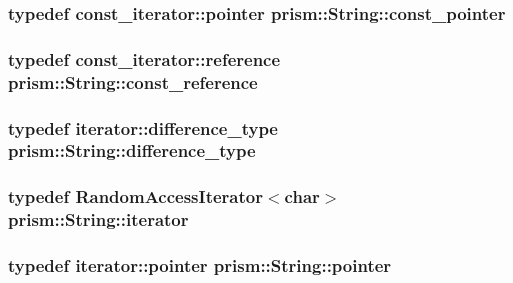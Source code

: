 \subsubsection[{\texorpdfstring{const\+\_\+pointer}{const_pointer}}]{\setlength{\rightskip}{0pt plus 5cm}typedef {\bf const\+\_\+iterator\+::pointer} {\bf prism\+::\+String\+::const\+\_\+pointer}}\hypertarget{classprism_1_1_string_adbea4cbf0f4f62948eb2accf7d402456}{}\label{classprism_1_1_string_adbea4cbf0f4f62948eb2accf7d402456}
\subsubsection[{\texorpdfstring{const\+\_\+reference}{const_reference}}]{\setlength{\rightskip}{0pt plus 5cm}typedef {\bf const\+\_\+iterator\+::reference} {\bf prism\+::\+String\+::const\+\_\+reference}}\hypertarget{classprism_1_1_string_a7825c62cb2047e36ec704a17ef94f299}{}\label{classprism_1_1_string_a7825c62cb2047e36ec704a17ef94f299}
\subsubsection[{\texorpdfstring{difference\+\_\+type}{difference_type}}]{\setlength{\rightskip}{0pt plus 5cm}typedef {\bf iterator\+::difference\+\_\+type} {\bf prism\+::\+String\+::difference\+\_\+type}}\hypertarget{classprism_1_1_string_a50fc3d423db1d24c511b28b24e4a7c00}{}\label{classprism_1_1_string_a50fc3d423db1d24c511b28b24e4a7c00}
\subsubsection[{\texorpdfstring{iterator}{iterator}}]{\setlength{\rightskip}{0pt plus 5cm}typedef {\bf Random\+Access\+Iterator}$<$char$>$ {\bf prism\+::\+String\+::iterator}}\hypertarget{classprism_1_1_string_adacc7975837e5fff95d70690777fb330}{}\label{classprism_1_1_string_adacc7975837e5fff95d70690777fb330}
\subsubsection[{\texorpdfstring{pointer}{pointer}}]{\setlength{\rightskip}{0pt plus 5cm}typedef {\bf iterator\+::pointer} {\bf prism\+::\+String\+::pointer}}\hypertarget{classprism_1_1_string_ac7944d9212ad675ba05280657ce14d12}{}\label{classprism_1_1_string_ac7944d9212ad675ba05280657ce14d12}
